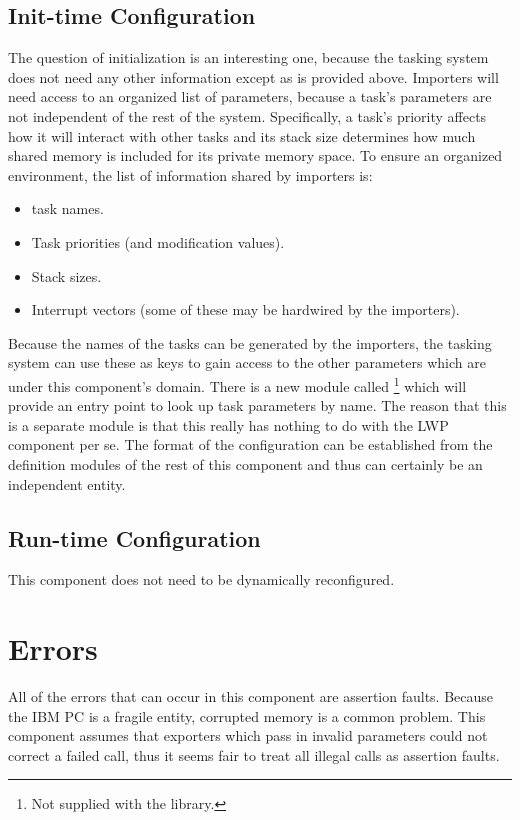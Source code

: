 \subsection{Init-time Configuration}
The question of initialization is an interesting one, because the tasking
system does not need any other information except as is provided above.
Importers will need access to an organized list of parameters, 
because a task's parameters are not independent of the rest of the system.  
Specifically, a task's priority affects how it will interact with other
tasks and its stack size determines how much shared memory is included
for its private memory space.  To ensure an organized environment,
the list of information shared by importers is:
\begin{itemize}
\item
    task names.
\item
    Task priorities (and modification values).
\item
    Stack sizes.
\item
    Interrupt vectors (some of these may be hardwired by the importers).
\end{itemize}

Because the names of the tasks can be generated by the importers, the
tasking system can use these as keys to gain access to the other parameters
which are under this component's domain.  There is a new module called
\footnote{Not supplied with the library.} which will 
provide an entry point to look 
up task parameters
by name.  The reason that this is a separate module is that this really
has nothing to do with the LWP component per se.  The format of the
configuration can be established from the definition modules of the rest
of this component and thus  can certainly be an 
independent entity.

\subsection{Run-time Configuration}
This component does not need to be dynamically reconfigured.

\section{Errors}
All of the errors that can occur in this component are assertion faults.
Because the IBM PC is a fragile entity, corrupted memory is a common problem.
This component assumes that exporters which pass in invalid parameters
could not correct a failed call, thus it seems fair to treat all illegal
calls as  assertion faults.

